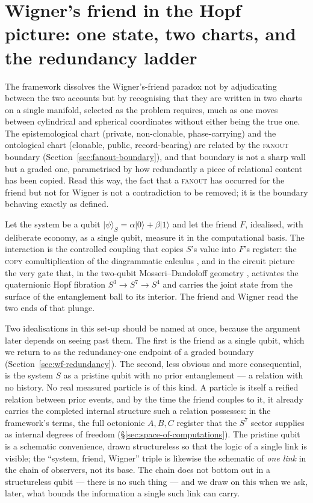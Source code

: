 \section{Wigner's friend in the Hopf picture: one state, two charts, and the redundancy ladder}
\label{sec:wigners-friend}

The framework dissolves the Wigner's-friend paradox \autocite{wigner_1961} not by
adjudicating between the two accounts but by recognising that they are written in
two charts on a single manifold, selected as the problem requires, much as one
moves between cylindrical and spherical coordinates without either being the true
one. The epistemological chart (private, non-clonable, phase-carrying) and the
ontological chart (clonable, public, record-bearing) are related by the
\textsc{fanout} boundary (Section~\ref{sec:fanout-boundary}), and that boundary
is not a sharp wall but a graded one, parametrised by how redundantly a piece of
relational content has been copied. Read this way, the fact that a \textsc{fanout}
has occurred for the friend but not for Wigner is not a contradiction to be
removed; it is the boundary behaving exactly as defined.

Let the system be a qubit $\lvert\psi\rangle_{S}=\alpha\lvert 0\rangle
+\beta\lvert 1\rangle$ and let the friend $F$, idealised, with deliberate
economy, as a single qubit, measure it in the computational basis. The
interaction is the controlled coupling that copies $S$'s value into $F$'s
register: the \textsc{copy} comultiplication of the diagrammatic calculus
\autocite{CoeckeKissinger2017}, and in the circuit picture the very gate that, in
the two-qubit Mosseri--Dandoloff geometry \autocite{mosseri2001hopf},
activates the quaternionic Hopf fibration $S^{3}\to S^{7}\to S^{4}$ and carries
the joint state from the surface of the entanglement ball to its interior. The
friend and Wigner read the two ends of that plunge.

Two idealisations in this set-up should be named at once, because the argument
later depends on seeing past them. The first is the friend as a single qubit,
which we return to as the redundancy-one endpoint of a graded boundary
(Section~\ref{sec:wf-redundancy}). The second, less obvious and more consequential,
is the system $S$ as a pristine qubit with no prior entanglement --- a relation
with no history. No real measured particle is of this kind. A particle is itself a
reified relation between prior events, and by the time the friend couples to it, it
already carries the completed internal structure such a relation possesses: in the
framework's terms, the full octonionic $A,B,C$ register that the $S^{7}$ sector
supplies as internal degrees of freedom (\S\ref{sec:space-of-computations}). The
pristine qubit is a schematic convenience, drawn structureless so that the logic of
a single link is visible; the ``system, friend, Wigner'' triple is likewise the
schematic of \emph{one link} in the chain of observers, not its base. The chain
does not bottom out in a structureless qubit --- there is no such thing --- and we
draw on this when we ask, later, what bounds the information a single such link can
carry.

